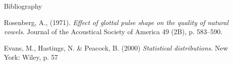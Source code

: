 \documentclass[final]{beamer}
\begin{document}
\begin{frame}[t]
\begin{columns}[t]
\begin{column}{.465\textwidth}
\begin{block}{Bibliography}
\begin{scriptsize}
\begin{thebibliography}{9}
    Rosenberg, A., (1971).
    \emph{Effect of glottal pulse shape on the quality of natural vowels}.
    Journal of the Acoustical Society of America 49 (2B), p. 583–590.
    
    Evans, M., Hastings, N. \& Peacock, B. (2000)
    \emph{Statistical distributions}.
    New York: Wiley, p. 57

\end{thebibliography}


\end{scriptsize}

\end{block}



\end{column} %

\begin{column}{.015\textwidth}\end{column} %

\end{columns} %

\end{frame} %
\end{document}

